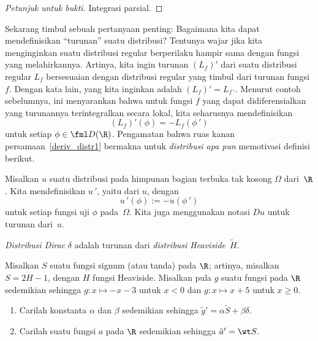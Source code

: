 \begin{proof}[\emph{Petunjuk untuk bukti}] Integrasi parsial. \ns
\end{proof}

Sekarang timbul sebuah pertanyaan penting: Bagaimana kita dapat mendefinisikan ``turunan'' suatu distribusi? Tentunya wajar jika kita menginginkan suatu
distribusi regular berperilaku hampir sama dengan fungsi yang melahirkannya. Artinya, kita ingin turunan $(L_f)'$ dari
suatu distribusi regular $L_f$ bersesuaian dengan distribusi regular yang timbul dari turunan fungsi~$f$. Dengan kata lain,
yang kita inginkan adalah $(L_f)' = L_{f\,'}$. Menurut contoh sebelumnya, ini menyarankan bahwa untuk fungsi $f$ yang dapat didiferensialkan
yang turunannya terintegralkan secara lokal, kita seharusnya mendefinisikan
   \begin{equation}\label{deriv_distr1}
        (L_f)'(\phi) = -L_f(\phi\,')
   \end{equation}
untuk setiap $\phi \in \fml D(\R)$. Pengamatan bahwa ruas kanan persamaan~\eqref{deriv_distr1} bermakna untuk
\emph{distribusi apa pun} memotivasi definisi berikut.

\begin{defn}\label{def_deriv_distr} Misalkan $u$ suatu distribusi pada himpunan bagian terbuka tak kosong $\Omega$ dari~$\R$. Kita mendefinisikan $u\,'$, yaitu
 dari $u$,
dengan
    \[ u\,'(\phi) := -u(\phi\,') \]
untuk setiap fungsi uji $\phi$ pada~$\Omega$. Kita juga menggunakan notasi $Du$ untuk turunan dari~$u$.
\end{defn}

\begin{exam} \emph{Distribusi Dirac} $\delta$ adalah turunan dari \emph{distribusi Heaviside}~$\widetilde H$.
\end{exam}

\begin{exer} Misalkan $S$ suatu fungsi signum (atau tanda) pada $\R$; artinya, misalkan $S = 2H - 1$, dengan $H$ fungsi Heaviside.
Misalkan pula $g$ suatu fungsi pada $\R$ sedemikian sehingga $g\colon x \mapsto -x - 3$ untuk $x < 0$ dan $g\colon x \mapsto x + 5$ untuk $x \ge 0$.
   \begin{enumerate}[label=\rm{(\alph*)}]
     \item Carilah konstanta $\alpha$ dan $\beta$ sedemikian sehingga ${\tilde g}' = \alpha \widetilde S + \beta \delta$.
     \item Carilah suatu fungsi $a$ pada $\R$ sedemikian sehingga ${\tilde a}' = \wt S$.
   \end{enumerate}
\end{exer}

